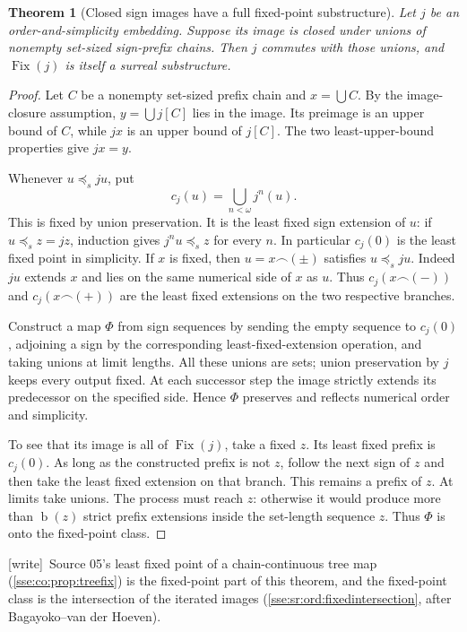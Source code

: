 \documentclass[11pt,a4paper]{article}
\numberwithin{equation}{section}
\theoremstyle{plain}
\newtheorem{theorem}{Theorem}[section]
\theoremstyle{definition}
\theoremstyle{remark}
\newcommand{\Fix}{\operatorname{Fix}}
\newcommand{\bday}{\operatorname{b}}
\newcommand{\pref}{\preccurlyeq_s}
\newcommand{\concat}{\mathbin{\frown}}
\newcommand{\wtag}{\textup{\textsf{[write]}}}%
\newenvironment{wnote}{\par\smallskip\noindent\wtag\ }{\par\smallskip}
\begin{document}
\begin{theorem}[Closed sign images have a full fixed-point substructure]
\label{sse:thm:closedtree}
Let $j$ be an order-and-simplicity embedding. Suppose its image is closed
under unions of nonempty set-sized sign-prefix chains. Then $j$ commutes
with those unions, and $\Fix(j)$ is itself a surreal substructure.
\end{theorem}
\begin{proof}
Let $C$ be a nonempty set-sized prefix chain and $x=\bigcup C$.
By the image-closure assumption, $y=\bigcup j[C]$ lies in the image.
Its preimage is an upper bound of $C$, while $jx$ is an upper bound of
$j[C]$. The two least-upper-bound properties give $jx=y$.

Whenever $u\pref ju$, put
\[
 c_j(u)=\bigcup_{n<\omega}j^n(u).
\]
This is fixed by union preservation. It is the least fixed sign extension
of $u$: if $u\pref z=jz$, induction gives $j^n u\pref z$ for every $n$.
In particular $c_j(0)$ is the least fixed point in simplicity.
If $x$ is fixed, then $u=x\concat(\pm)$ satisfies $u\pref ju$.
Indeed $ju$ extends $x$ and lies on the same numerical side of $x$ as $u$.
Thus $c_j(x\concat(-))$ and $c_j(x\concat(+))$ are the least fixed
extensions on the two respective branches.

Construct a map $\Phi$ from sign sequences by sending the empty sequence
to $c_j(0)$, adjoining a sign by the corresponding least-fixed-extension
operation, and taking unions at limit lengths. All these unions are sets;
union preservation by $j$ keeps every output fixed. At each successor
step the image strictly extends its predecessor on the specified side.
Hence $\Phi$ preserves and reflects numerical order and simplicity.

To see that its image is all of $\Fix(j)$, take a fixed $z$. Its least
fixed prefix is $c_j(0)$. As long as the constructed prefix is not $z$,
follow the next sign of $z$ and then take the least fixed extension on
that branch. This remains a prefix of $z$. At limits take unions. The
process must reach $z$: otherwise it would produce more than
$\bday(z)$ strict prefix extensions inside the set-length sequence $z$.
Thus $\Phi$ is onto the fixed-point class.
\end{proof}
\begin{wnote}Source 05's least fixed point of a chain-continuous tree map (\cref{sse:co:prop:treefix}) is the fixed-point part of this theorem, and the fixed-point class is the intersection of the iterated images (\cref{sse:sr:ord:fixedintersection}, after Bagayoko--van der Hoeven).\end{wnote}
\end{document}
